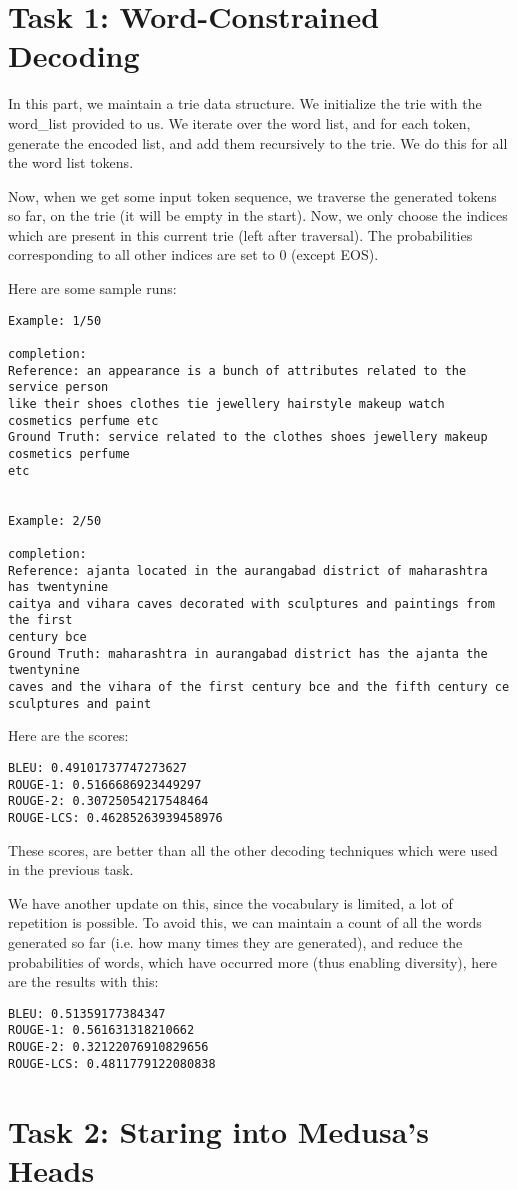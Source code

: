 \documentclass[a4paper,12pt]{article}
\begin{document}
\clearpage
\section{Task 1: Word-Constrained Decoding}
In this part, we maintain a trie data structure. We initialize the trie with the word\_list provided to us. We iterate over the word list, and for each token, generate the encoded list, and add them recursively to the trie. We do this for all the word list tokens.

Now, when we get some input token sequence, we traverse the generated tokens so far, on the trie (it will be empty in the start). Now, we only choose the indices which are present in this current trie (left after traversal). The probabilities corresponding to all other indices are set to 0 (except EOS).

Here are some sample runs:
\begin{verbatim}
Example: 1/50

completion:
Reference: an appearance is a bunch of attributes related to the service person 
like their shoes clothes tie jewellery hairstyle makeup watch cosmetics perfume etc
Ground Truth: service related to the clothes shoes jewellery makeup cosmetics perfume 
etc


Example: 2/50

completion:
Reference: ajanta located in the aurangabad district of maharashtra has twentynine 
caitya and vihara caves decorated with sculptures and paintings from the first
century bce
Ground Truth: maharashtra in aurangabad district has the ajanta the twentynine 
caves and the vihara of the first century bce and the fifth century ce 
sculptures and paint
\end{verbatim}


Here are the scores:

\begin{verbatim}
BLEU: 0.49101737747273627
ROUGE-1: 0.5166686923449297
ROUGE-2: 0.30725054217548464
ROUGE-LCS: 0.46285263939458976
\end{verbatim}


These scores, are better than all the other decoding techniques which were used in the previous task. 


We have another update on this, since the vocabulary is limited, a lot of repetition is possible. To avoid this, we can maintain a count of all the words generated so far (i.e. how many times they are generated), and reduce the probabilities of words, which have occurred more (thus enabling diversity), here are the results with this:

\begin{verbatim}
BLEU: 0.51359177384347
ROUGE-1: 0.561631318210662
ROUGE-2: 0.32122076910829656
ROUGE-LCS: 0.4811779122080838
\end{verbatim}

\section{Task 2: Staring into Medusa's Heads}
\end{document}
